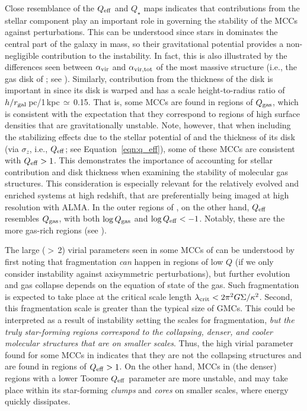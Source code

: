 \IfFileExists{emulateapjlegacy.cls}{\documentclass[iop]{emulateapjlegacy}}{\documentclass[iop]{emulateapj}}
\begin{document}
Close resemblance of the $Q_{\rm eff}$ and $Q_{\star}$ maps indicates that contributions from the stellar component play an important role in governing the stability of the MCCs against perturbations. This can be understood since stars in \flower dominates the central part of the galaxy in mass, so their gravitational potential provides a non-negligible contribution to the instability. In fact, this is also illustrated by the differences seen between $\alpha_{\rm vir}$ and $\alpha_{\rm vir, tot}$ 
of the most massive structure (i.e., the gas disk of \flower; see ).
Similarly, contribution from the thickness of the disk is important in \flower since its disk is warped and has a scale height-to-radius ratio of $h/r_{\rm gal}$\,pc/1\,kpc\,$\simeq$\,0.15.
% 
That is, some MCCs are found in regions of $Q_{\rm gas}$, which is consistent with the expectation that they correspond to regions of high surface densities that are gravitationally unstable. Note, however, that when including the stabilizing effects due to the stellar potential of \flower and the thickness of its disk (via $\sigma_z$, i.e., $Q_{\rm eff}$; see Equation~\ref{eqn:q_eff}), some of these MCCs are consistent with $Q_{\rm eff} > 1$. 
%
This demonstrates the importance of accounting for stellar contribution and disk thickness when examining the stability of molecular gas structures. This consideration is especially relevant for the relatively evolved and enriched systems at high redshift, that are preferentially being imaged at high resolution with ALMA. In the outer regions of \flower, on the other hand, $Q_{\rm eff}$ resembles $Q_{\rm gas}$, with both $\log{Q_{\rm gas}}$ and $\log{Q_{\rm eff}} < -1$. Notably, these are the more gas-rich regions (see ).

The large ($>$\,2) virial parameters seen in some MCCs of \flower can be understood by first noting that fragmentation {\em can} happen in regions of low $Q$ (if we only consider instability against axisymmetric perturbations), but further evolution and gas collapse depends on the equation of state of the gas.
%
Such fragmentation is expected to take place at the critical scale length $\lambda_{\rm crit} < 2 \pi^2 G \Sigma / \kappa^2$. Second, this fragmentation scale is greater than the typical size of GMCs.
%
This could be interpreted as a result of instability setting the scales for fragmentation, {\em but the truly star-forming regions correspond to the collapsing, denser, and cooler molecular structures that are on smaller scales}.
%
Thus, the high virial parameter found for some MCCs in \flower indicates that they are not the collapsing structures and are found in regions of $Q_{\rm eff}>1$. On the other hand, MCCs in (the denser) regions with a lower Toomre $Q_{\rm eff}$ parameter are more unstable, and \SF may take place within its star-forming {\it clumps} and {\it cores} on smaller scales, where energy quickly dissipates.
\end{document}
